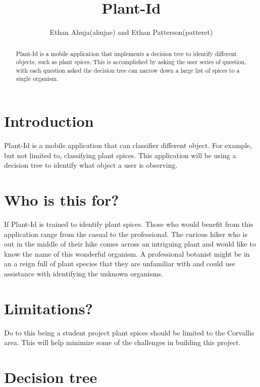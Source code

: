 \documentclass[a4paper]{article}
\title{Plant-Id}
\author{Ethan Ahuja(ahujae) and Ethan Patterson(patteret)}
\begin{document}
\maketitle

\begin{abstract}
Plant-Id is a mobile application that implements a decision tree to identify different objects, such as plant spices. This is accomplished by asking the user series of question, with each question asked the decision tree can narrow down a large list of spices to a single organism.
\end{abstract}
\section{Introduction}
Plant-Id is a mobile application that can classifier different object. For example, but not limited to, classifying plant spices. This application will be using a decision tree to identify what object a user is observing.
\section{Who is this for?}
If Plant-Id is trained to identify plant spices. Those who would benefit from this application range from the casual to the professional. The curious hiker who is out in the middle of their hike comes across an intriguing plant and would like to know the name of this wonderful organism. A professional botanist might be in an a reign full of plant species that they are unfamiliar with and could use assistance with identifying the unknown organisms. 
\section{Limitations?}
Do to this being a student project plant spices should be limited to the Corvallis area. This will help minimize some of the challenges in building this project. 
\section{Decision tree}
\end{document}
